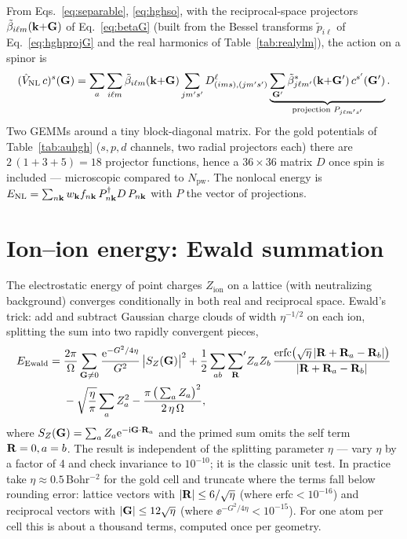 From Eqs.~\eqref{eq:separable}, \eqref{eq:hghso}, with the reciprocal-space
projectors $\tilde\beta_{i\ell m}(\mathbf{k}{+}\mathbf{G})$ of Eq.~\eqref{eq:betaG}
(built from the Bessel transforms $\tilde p_{i\ell}$ of
Eq.~\eqref{eq:hghprojG} and the real harmonics of
Table~\ref{tab:realylm}), the action on a spinor is
\begin{equation}
(\hat V_{\mathrm{NL}}\, c)^{s}(\mathbf{G})
= \sum_{a}\sum_{i\ell m}
\tilde\beta_{i\ell m}(\mathbf{k}{+}\mathbf{G})
\sum_{j m' s'} D^{\ell}_{(i m s),(j m' s')}
\underbrace{\sum_{\mathbf{G}'} \tilde\beta^{*}_{j\ell m'}(\mathbf{k}{+}\mathbf{G}')\,
c^{s'}(\mathbf{G}')}_{\text{projection } P_{j\ell m' s'}} .
\label{eq:vnl_action}
\end{equation}
Two GEMMs around a tiny block-diagonal matrix. For the gold potentials of
Table~\ref{tab:auhgh} ($s,p,d$ channels, two radial projectors each) there
are $2\,(1 + 3 + 5) = 18$ projector functions, hence a $36\times36$ matrix
$D$ once spin is included --- microscopic compared to $N_{\mathrm{pw}}$.
The nonlocal energy is $E_{\mathrm{NL}} = \sum_{n\mathbf{k}} w_{\mathbf{k}} f_{n\mathbf{k}}\,
P_{n\mathbf{k}}^\dagger D\, P_{n\mathbf{k}}$ with $P$ the vector of projections.

\section{Ion--ion energy: Ewald summation}
\label{sec:ewald}

The electrostatic energy of point charges $Z_{\mathrm{ion}}$ on a lattice
(with neutralizing background) converges conditionally in both real and
reciprocal space. Ewald's trick: add and subtract Gaussian charge clouds of
width $\eta^{-1/2}$ on each ion, splitting the sum into two rapidly
convergent pieces,
\begin{equation}
\begin{aligned}
E_{\mathrm{Ewald}}
={}& \frac{2\pi}{\Omega} \sum_{\mathbf{G}\neq 0}
\frac{\mathrm{e}^{-G^2/4\eta}}{G^2}\, \big|S_Z(\mathbf{G})\big|^2
+ \frac12 \sum_{a b}{\sum_{\mathbf{R}}}'
Z_a Z_b\, \frac{\mathrm{erfc}\big(\sqrt{\eta}\,
|\mathbf{R} + \mathbf{R}_a - \mathbf{R}_b|\big)}{|\mathbf{R} + \mathbf{R}_a - \mathbf{R}_b|}\\
&- \sqrt{\frac{\eta}{\pi}} \sum_a Z_a^2
- \frac{\pi\, \big(\sum_a Z_a\big)^2}{2\,\eta\,\Omega},
\end{aligned}
\label{eq:ewald}
\end{equation}
where $S_Z(\mathbf{G}) = \sum_a Z_a \mathrm{e}^{-\mathrm{i}\mathbf{G}\cdot\mathbf{R}_a}$ and the primed sum
omits the self term $\mathbf{R} = 0, a = b$. The result is independent of the
splitting parameter $\eta$ --- vary $\eta$ by a factor of 4 and check
invariance to $10^{-10}$; it is the classic unit test. In practice take
$\eta \approx 0.5$\,Bohr$^{-2}$ for the gold cell and truncate where the
terms fall below rounding error: lattice vectors with
$|\mathbf{R}| \le 6/\sqrt\eta$ (where $\mathrm{erfc} < 10^{-16}$) and reciprocal
vectors with $|\mathbf{G}| \le 12\sqrt\eta$ (where
$\ee^{-G^2/4\eta} < 10^{-15}$). For one atom per cell
this is about a thousand terms, computed once per geometry.

